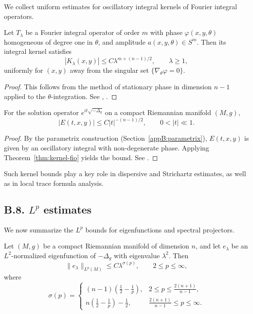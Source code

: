 We collect uniform estimates for oscillatory integral kernels of Fourier integral operators.

\begin{theorem}
\label{thm:kernel-fio}
Let $T_\lambda$ be a Fourier integral operator of order $m$ with phase $\varphi(x,y,\theta)$ homogeneous of degree one in $\theta$, and amplitude $a(x,y,\theta) \in S^m$. Then its integral kernel satisfies
\[
|K_\lambda(x,y)| \leq C \lambda^{m + (n-1)/2}, \qquad \lambda \geq 1,
\]
uniformly for $(x,y)$ away from the singular set $\{\nabla_\theta \varphi=0\}$.
\end{theorem}

\begin{proof}
This follows from the method of stationary phase in dimension $n-1$ applied to the $\theta$-integration. See \cite[Chapter~7]{HormanderI}, \cite[Chapter~VIII]{Stein}.
\end{proof}

\begin{lemma}
\label{lem:wave-kernel}
For the solution operator $e^{it\sqrt{-\Delta_g}}$ on a compact Riemannian manifold $(M,g)$,
\[
|E(t,x,y)| \leq C |t|^{-(n-1)/2}, \qquad 0<|t|\ll 1.
\]
\end{lemma}

\begin{proof}
By the parametrix construction (Section~\ref{appB:parametrix}), $E(t,x,y)$ is given by an oscillatory integral with non-degenerate phase. Applying Theorem~\ref{thm:kernel-fio} yields the bound. See \cite[Chapter~2]{Sogge}.
\end{proof}

\begin{remark}
Such kernel bounds play a key role in dispersive and Strichartz estimates, as well as in local trace formula analysis.
\end{remark}

\medskip

\subsection*{B.8. $L^p$ estimates}
\label{appB:Lp}

We now summarize the $L^p$ bounds for eigenfunctions and spectral projectors.

\begin{theorem}
\label{thm:sogge}
Let $(M,g)$ be a compact Riemannian manifold of dimension $n$, and let $e_\lambda$ be an $L^2$-normalized eigenfunction of $-\Delta_g$ with eigenvalue $\lambda^2$. Then
\[
\| e_\lambda \|_{L^p(M)} \leq C \lambda^{\sigma(p)}, \qquad 2 \leq p \leq \infty,
\]
where
\[
\sigma(p) =
\begin{cases}
(n-1)\left(\tfrac{1}{2} - \tfrac{1}{p}\right), & 2 \leq p \leq \tfrac{2(n+1)}{n-1}, \\[6pt]
n\left(\tfrac{1}{2} - \tfrac{1}{p}\right) - \tfrac{1}{2}, & \tfrac{2(n+1)}{n-1} \leq p \leq \infty.
\end{cases}
\]
\end{theorem}

